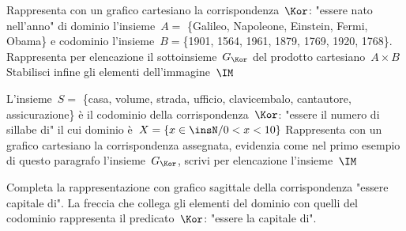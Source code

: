 \begin{esercizio}
\label{ese:C.1}
Rappresenta con un grafico cartesiano la corrispondenza~$\Kor$: "essere nato 
nell'anno" di dominio l'insieme~$A=$ \{Galileo, Napoleone, Einstein, Fermi, 
Obama\}
e codominio l'insieme~$B=$\{1901, 1564, 1961, 1879, 1769, 1920, 1768\}. 
Rappresenta per elencazione il sottoinsieme~$G_\Kor$ del prodotto cartesiano~$A 
\times B$
Stabilisci infine gli elementi dell'immagine~$\IM$
\end{esercizio}

\begin{esercizio}
\label{ese:C.2}
L'insieme~$S=$ \{casa, volume, strada, ufficio, clavicembalo, cantautore, 
assicurazione\} è il codominio della corrispondenza~$\Kor$: "essere il numero di 
sillabe di" il cui dominio
è~$X=\{x \in\insN / 0<x<10\}$ Rappresenta con un grafico cartesiano la 
corrispondenza assegnata, evidenzia come nel primo esempio di questo paragrafo 
l'insieme~$G_\Kor$,
scrivi per elencazione l'insieme~$\IM$
\end{esercizio}

\begin{esercizio}
\label{ese:C.3}
Completa la rappresentazione con grafico sagittale della corrispondenza "essere 
capitale di". La freccia che collega gli elementi del dominio con quelli del 
codominio rappresenta
il predicato~$\Kor$: "essere la capitale di".
\begin{center}
 
\end{center}

\end{esercizio}

